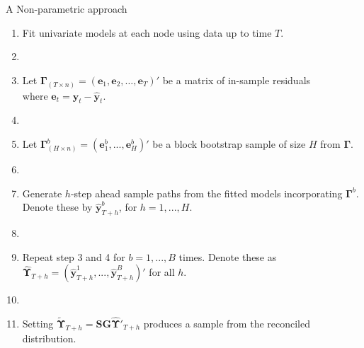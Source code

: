 \documentclass[11pt,xcolor=dvipsnames,table]{beamer} %
\newcounter{saveenumi}
\newcommand{\seti}{\setcounter{saveenumi}{\value{enumi}}}
\begin{document}
\begin{frame}{A Non-parametric approach}
\begin{enumerate}[<+-| alert@+>]
\item Fit univariate models at each node using data up to time $T$.
\item[]
\item Let $\bm{\Gamma}_{(T \times n)}=(\bm{e}_1,\bm{e}_2,\dots,\bm{e}_T)'$ be a matrix of in-sample residuals\\
where $\bm{e}_t=\bm{y}_t-\hat{\bm{y}}_t$. 
\item[]
\item Let $\bm{\Gamma}^b_{(H \times n)} = (\bm{e}^b_1,...,\bm{e}^b_H)'$ be a block bootstrap sample of size $H$ from $\bm{\Gamma}$.  
\item[]
\item Generate $h$-step ahead sample paths from the fitted models incorporating $\bm{\Gamma}^b$. Denote these by $\hat{\bm{y}}^b_{T+h}$, for $h=1,...,H$.

\item[]
\item  Repeat step 3 and 4 for $b = 1,...,B$ times. Denote these as $\hat{\bm{\Upsilon}}_{T+h}=(\hat{\bm{y}}^1_{T+h},...,\hat{\bm{y}}^B_{T+h})'$ for all $h$.
\item[]
\item Setting $\tilde{\bm{\Upsilon}}_{T+h} = \bm{SG}\hat{\bm{\Upsilon}}'_{T+h}$ produces a sample from the reconciled distribution.

\seti
\end{enumerate}
\end{frame}
%
%
\end{document}
